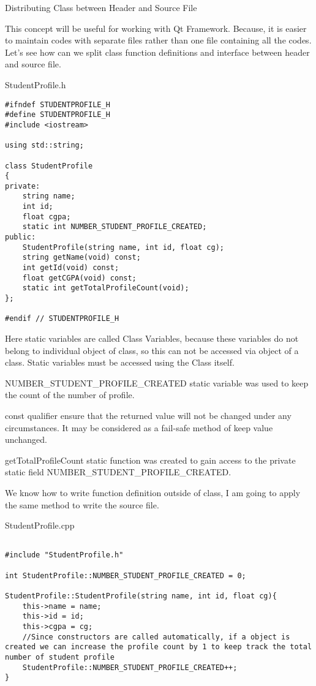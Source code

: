 \documentclass[newPxFont]{beamer}
\begin{document}
\begin{frame}{Distributing Class between Header and Source File}

This concept will be useful for working with Qt Framework. Because, it is easier to maintain codes with separate files rather than one file containing all the codes. Let's see how can we split class function definitions and interface between header and source file.

\alert{StudentProfile.h}
\begin{verbatim}
#ifndef STUDENTPROFILE_H
#define STUDENTPROFILE_H
#include <iostream>

using std::string;

class StudentProfile
{
private:
    string name;
    int id;
    float cgpa;
    static int NUMBER_STUDENT_PROFILE_CREATED;
public:
    StudentProfile(string name, int id, float cg);
    string getName(void) const;
    int getId(void) const;
    float getCGPA(void) const;
    static int getTotalProfileCount(void);
};

#endif // STUDENTPROFILE_H
\end{verbatim}

Here \alert{static} variables are called Class Variables, because these variables do not belong to individual object of class, so this can not be accessed via object of a class. Static variables must be accessed using the Class itself. 

\alert{NUMBER\_STUDENT\_PROFILE\_CREATED} static variable was used to keep the count of the number of profile.

\alert{const} qualifier ensure that the returned value will not be changed under any circumstances. It may be considered as a fail-safe method of keep value unchanged.

\alert{getTotalProfileCount} static function was created to gain access to the private static field \alert{NUMBER\_STUDENT\_PROFILE\_CREATED}.

We know how to write function definition outside of class, I am going to apply the same method to write the source file.

\alert{StudentProfile.cpp}

\begin{verbatim}

#include "StudentProfile.h"

int StudentProfile::NUMBER_STUDENT_PROFILE_CREATED = 0;

StudentProfile::StudentProfile(string name, int id, float cg){
    this->name = name;
    this->id = id;
    this->cgpa = cg;
    //Since constructors are called automatically, if a object is created we can increase the profile count by 1 to keep track the total number of student profile
    StudentProfile::NUMBER_STUDENT_PROFILE_CREATED++;
}


\end{verbatim}
\end{frame}
\end{document}
